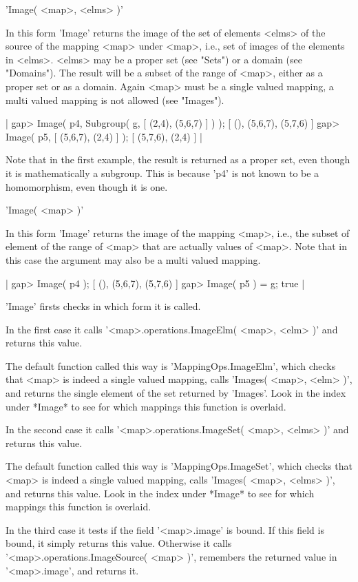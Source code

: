 'Image( <map>, <elms> )'

In this form  'Image' returns the  image of the set of elements <elms> of
the source  of the mapping <map> under <map>,  i.e., set of images of the
elements in <elms>.  <elms> may be a proper set (see "Sets") or a  domain
(see  "Domains").   The result will be  a subset  of the  range of <map>,
either as a proper set  or  as  a  domain.  Again <map> must be a  single
valued mapping, a multi valued mapping is not allowed (see "Images").

|    gap> Image( p4, Subgroup( g, [ (2,4), (5,6,7) ] ) );
    [ (), (5,6,7), (5,7,6) ]
    gap> Image( p5, [ (5,6,7), (2,4) ] );
    [ (5,7,6), (2,4) ] |

Note that in the  first example, the  result is returned as a proper set,
even though it is mathematically a subgroup.  This is because 'p4' is not
known to be a homomorphism, even though it is one.

'Image( <map> )'

In  this form 'Image' returns the image of the  mapping <map>, i.e.,  the
subset  of element  of  the range  of <map>  that are  actually values of
<map>.  Note that in  this case the argument may also be  a multi  valued
mapping.

|    gap> Image( p4 );
    [ (), (5,6,7), (5,7,6) ]
    gap> Image( p5 ) = g;
    true |

'Image' firsts checks in which form it is called.

In the  first case it  calls '<map>.operations.ImageElm(  <map>, <elm> )'
and returns this value.

The  default function called  this  way  is  'MappingOps.ImageElm', which
checks that <map>  is  indeed  a single  valued  mapping,  calls 'Images(
<map>, <elm> )', and  returns  the single element of the set  returned by
'Images'.  Look in the index under *Image* to see for which mappings this
function is overlaid.

In the second case it calls '<map>.operations.ImageSet( <map>,  <elms> )'
and returns this value.

The default  function  called this  way is  'MappingOps.ImageSet',  which
checks that  <map>  is  indeed a  single valued  mapping,  calls 'Images(
<map>, <elms>  )',  and returns  this  value.   Look  in the index  under
*Image* to see for which mappings this function is overlaid.

In the third case  it tests if the field '<map>.image' is bound.  If this
field  is  bound,  it  simply  returns this value.   Otherwise  it  calls
'<map>.operations.ImageSource( <map> )', remembers the returned  value in
'<map>.image', and returns it.

